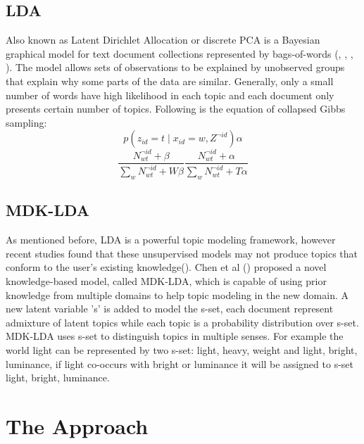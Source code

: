 \documentclass[11pt,twoside]{report}
\begin{document}
\section{LDA}
Also known as Latent Dirichlet Allocation or discrete PCA is a Bayesian graphical model for text document collections represented by bags-of-words (\cite{ref26}, \cite{ref25}, \cite{ref30}, \cite{ref31}). The model allows sets of observations to be explained by unobserved groups that explain why some parts of the data are similar. Generally, only a small number of words have high likelihood in each topic and each document only presents certain number of topics. Following is the equation of collapsed Gibbs sampling:
\begin{equation}
p(z_{id}=t\mid x_{id}=w,Z^{\neg id}) \alpha
\end{equation}
\begin{equation}
\frac{N_{wt}^{\neg id} + \beta}{\sum_{w}N_{wt}^{\neg id} + W\beta} \frac{N_{wt}^{\neg id} + \alpha}{\sum_{w}N_{wt}^{\neg id} + T\alpha}
\end{equation}
\section{MDK-LDA}
As mentioned before, LDA is a powerful topic modeling framework, however recent studies found that these unsupervised models may not produce topics that conform to the user's existing knowledge(\cite{ref24}). Chen et al (\cite{ref24}) proposed a novel knowledge-based model, called MDK-LDA, which is capable of using prior knowledge from multiple domains to help topic modeling in the new domain. A new latent variable 's' is added to model the s-set, each document represent admixture of latent topics while each topic is a probability distribution over s-set. MDK-LDA uses s-set to distinguish topics in multiple senses. For example the world light can be represented by two s-set: {light, heavy, weight} and {light, bright, luminance}, if light co-occurs with bright or luminance it will be assigned to s-set {light, bright, luminance}.

\chapter{The Approach}
\end{document}
